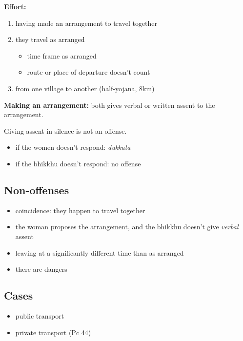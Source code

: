 \textbf{Effort:}

\begin{enumerate}
\def\labelenumi{\arabic{enumi}.}
\tightlist
\item
  having made an arrangement to travel together
\item
  they travel as arranged

  \begin{itemize}
  \tightlist
  \item
    time frame as arranged
  \item
    route or place of departure doesn't count
  \end{itemize}
\item
  from one village to another (half-yojana, 8km)
\end{enumerate}

\textbf{Making an arrangement:} both gives verbal or written assent to
the arrangement.

Giving assent in silence is not an offense.

\begin{itemize}
\tightlist
\item
  if the women doesn't respond: \emph{dukkata}
\item
  if the bhikkhu doesn't respond: no offense
\end{itemize}

\subsection{Non-offenses}

\begin{itemize}
\tightlist
\item
  coincidence: they happen to travel together
\item
  the woman proposes the arrangement, and the bhikkhu doesn't give
  \emph{verbal} assent
\item
  leaving at a significantly different time than as arranged
\item
  there are dangers
\end{itemize}

\subsection{Cases}

\begin{itemize}
\tightlist
\item
  public transport
\item
  private transport (Pc 44)
\end{itemize}

